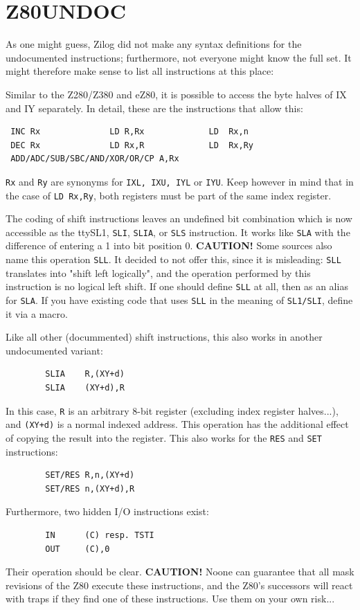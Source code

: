 \documentclass[12pt,twoside]{report}
\newcommand{\bb}[1]{{\bf #1}}
\newcommand{\tty}[1]{{\tt #1}}
\begin{document}

\section{Z80UNDOC}

As one might guess, Zilog did not make any syntax definitions for the
undocumented instructions; furthermore, not everyone might know the
full set.  It might therefore make sense to list all instructions at
this place:

Similar to the Z280/Z380 and eZ80, it is possible to access the byte halves
of IX and IY separately.  In detail, these are the instructions that allow
this:
\begin{verbatim}
 INC Rx              LD R,Rx             LD  Rx,n
 DEC Rx              LD Rx,R             LD  Rx,Ry
 ADD/ADC/SUB/SBC/AND/XOR/OR/CP A,Rx
\end{verbatim}
\tty{Rx} and \tty{Ry} are synonyms for \tty{IXL, IXU, IYL} or \tty{IYU}.
Keep however in mind that in the case of \tty{LD  Rx,Ry}, both registers
must be part of the same index register.

The coding of shift instructions leaves an undefined bit combination which
is now accessible as the tty{SL1}, \tty{SLI}, \tty{SLIA}, or \tty{SLS}
instruction.  It works like \tty{SLA} with the difference of entering a 1
into bit position 0.  \bb{CAUTION!} Some sources also name this operation
\tty{SLL}.  It decided to not offer this, since it is misleading: \tty{SLL}
translates into "shift left logically", and the operation performed by this
instruction is no logical left shift.  If one should define \tty{SLL} at
all, then as an alias for \tty{SLA}.  If you have existing code that uses
\tty{SLL} in the meaning of \tty{SL1/SLI}, define it via a macro.

Like all other (docummented) shift instructions, this also works in
another undocumented variant:
\begin{verbatim}
        SLIA    R,(XY+d)
        SLIA    (XY+d),R
\end{verbatim}
In this case, \tty{R} is an arbitrary 8-bit register (excluding index
register halves...), and \tty{(XY+d)} is a normal indexed address.  This
operation has the additional effect of copying the result into the
register.  This also works for the \tty{RES} and \tty{SET} instructions:
\begin{verbatim}
        SET/RES R,n,(XY+d)
        SET/RES n,(XY+d),R
\end{verbatim}
Furthermore, two hidden I/O instructions exist:
\begin{verbatim}
        IN      (C) resp. TSTI
        OUT     (C),0
\end{verbatim}
Their operation should be clear.  \bb{CAUTION!}  Noone can
guarantee that all mask revisions of the Z80 execute these
instructions, and the Z80's successors will react with traps if they
find one of these instructions.  Use them on your own risk...
\end{document}
